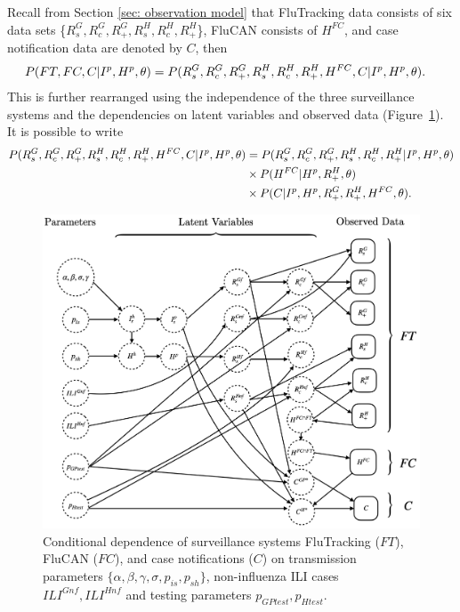 Recall from Section \ref{sec: observation model} that FluTracking data consists of six data sets \{$R_s^G,R_c^G, R_+^G, R_s^H, R_c^H, R_+^H$\}, FluCAN consists of $H^{FC}$, and case notification data are denoted by $C$, then
\begin{align} \notag
	P(FT,FC,C | I^p, H^p, \theta) &= P(R_s^G,R_c^G, R_+^G, R_s^H, R_c^H, R_+^H, H^{FC},C | I^p, H^p, \theta).
\end{align}
This is further rearranged using the independence of the three surveillance systems and the dependencies on latent variables and observed data (Figure~\ref{fig:DAG}). It is possible to write
\begin{align} \notag
	P(R_s^G,R_c^G, R_+^G, R_s^H, R_c^H, R_+^H, H^{FC},C | I^p, H^p, \theta) &= P(R_s^G,R_c^G, R_+^G, R_s^H, R_c^H, R_+^H | I^p, H^p, \theta)\\ \notag
	&\times P(H^{FC}| H^p, R_+^H, \theta) \\
	&\times P(C | I^p, H^p, R_+^G, R_+^H, H^{FC}, \theta).
\end{align}

\begin{figure}[h!]
	\centering
	\includegraphics[scale=0.45]{Figs/DAG_noFF100.png}
	\caption{Conditional dependence of surveillance systems FluTracking ($FT$), FluCAN ($FC$), and case notifications ($C$) on transmission parameters $\{ \alpha, \beta, \gamma, \sigma, p_{is}, p_{sh} \}$, non-influenza ILI cases $ILI^{Gnf}, ILI^{Hnf}$ and testing parameters $p_{GPtest}, p_{Htest}$.}
	\label{fig:DAG}
\end{figure}

